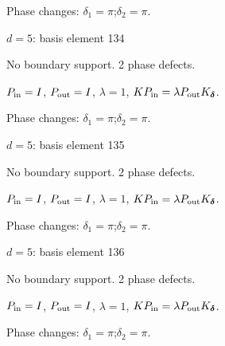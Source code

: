 \par\smallskip\begin{minipage}{.98\linewidth}\small Phase changes: $\delta_{1}=\pi$;\quad $\delta_{2}=\pi$.\end{minipage}
\vfill
{\footnotesize\texttt{}}
\newpage
{}
{\Large $d=5$: basis element 134}\par
No boundary support. 2 phase defects.
\begin{center}
\end{center}
\vspace{-1mm}
$P_{\rm in}=I$, \quad $P_{\rm out}=I$, \quad $\lambda=1$, \qquad $K P_{\rm in}=\lambda P_{\rm out}K_{\boldsymbol\delta}$.
\par\smallskip\begin{minipage}{.98\linewidth}\small Phase changes: $\delta_{1}=\pi$;\quad $\delta_{2}=\pi$.\end{minipage}
\vfill
{\footnotesize\texttt{}}
\newpage
{}
{\Large $d=5$: basis element 135}\par
No boundary support. 2 phase defects.
\begin{center}
\end{center}
\vspace{-1mm}
$P_{\rm in}=I$, \quad $P_{\rm out}=I$, \quad $\lambda=1$, \qquad $K P_{\rm in}=\lambda P_{\rm out}K_{\boldsymbol\delta}$.
\par\smallskip\begin{minipage}{.98\linewidth}\small Phase changes: $\delta_{1}=\pi$;\quad $\delta_{2}=\pi$.\end{minipage}
\vfill
{\footnotesize\texttt{}}
\newpage
{}
{\Large $d=5$: basis element 136}\par
No boundary support. 2 phase defects.
\begin{center}
\end{center}
\vspace{-1mm}
$P_{\rm in}=I$, \quad $P_{\rm out}=I$, \quad $\lambda=1$, \qquad $K P_{\rm in}=\lambda P_{\rm out}K_{\boldsymbol\delta}$.
\par\smallskip\begin{minipage}{.98\linewidth}\small Phase changes: $\delta_{1}=\pi$;\quad $\delta_{2}=\pi$.\end{minipage}
